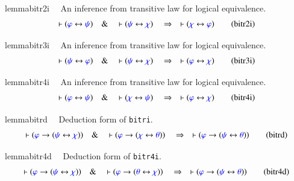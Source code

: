 \begin{restatable}{lemma}{bitr2i}~~ An inference from transitive law for logical
equivalence.  
\begin{align}
\vdash ( \mw{\varphi} \leftrightarrow \mw{\psi} )\quad\&\quad \vdash (
    \mw{\psi} \leftrightarrow \mw{\chi} )\quad\Rightarrow\quad \vdash (
    \mw{\chi} \leftrightarrow \mw{\varphi} )\label{eq:bitr2i}\tag{bitr2i}
\end{align}
\end{restatable}

\begin{restatable}{lemma}{bitr3i}~~ An inference from transitive law for logical
equivalence. 
\begin{align}
\vdash ( \mw{\psi} \leftrightarrow \mw{\varphi} )\quad\&\quad \vdash (
    \mw{\psi} \leftrightarrow \mw{\chi} )\quad\Rightarrow\quad \vdash (
    \mw{\varphi} \leftrightarrow \mw{\chi} )\label{eq:bitr3i}\tag{bitr3i}
\end{align}
\end{restatable}

\begin{restatable}{lemma}{bitr4i}~~ An inference from transitive law for logical
equivalence.  
\begin{align}
\vdash ( \mw{\varphi} \leftrightarrow \mw{\psi} )\quad\&\quad \vdash (
    \mw{\chi} \leftrightarrow \mw{\psi} )\quad\Rightarrow\quad \vdash (
    \mw{\varphi} \leftrightarrow \mw{\chi} )\label{eq:bitr4i}\tag{bitr4i}
\end{align}
\end{restatable}

\begin{restatable}{lemma}{bitrd}~~ Deduction form of {\tt bitri}.  
\begin{align}
\vdash ( \mw{\varphi} \rightarrow ( \mw{\psi} \leftrightarrow \mw{\chi} )
    )\quad\&\quad \vdash ( \mw{\varphi} \rightarrow ( \mw{\chi} \leftrightarrow
    \mw{\theta} ) )\quad\Rightarrow\quad \vdash ( \mw{\varphi} \rightarrow (
    \mw{\psi} \leftrightarrow \mw{\theta} ) )\label{eq:bitrd}\tag{bitrd}
\end{align}
\end{restatable}

\begin{restatable}{lemma}{bitr4d}~~ Deduction form of {\tt bitr4i}. 
\begin{align}
\vdash ( \mw{\varphi} \rightarrow ( \mw{\psi} \leftrightarrow \mw{\chi} )
    )\quad\&\quad \vdash ( \mw{\varphi} \rightarrow ( \mw{\theta}
    \leftrightarrow \mw{\chi} ) )\quad\Rightarrow\quad \vdash ( \mw{\varphi}
    \rightarrow ( \mw{\psi} \leftrightarrow \mw{\theta} )
    )\label{eq:bitr4d}\tag{bitr4d}
\end{align}
\end{restatable}

